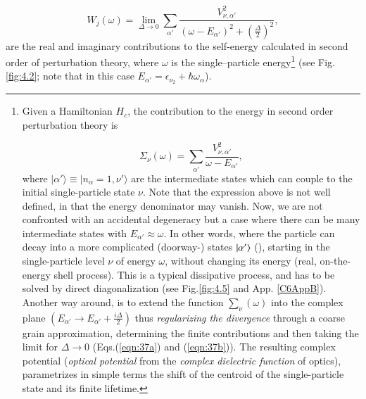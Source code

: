 \begin{equation}
W_j(\omega)  = \lim_{\Delta \rightarrow 0} \sum_{\alpha'} \frac{V_{\nu ,\alpha'}^2}{(\omega -E_{\alpha'})^2 + (\frac{\Delta}{2})^2},
\label{eqn:37b}
\end{equation}
are the real and imaginary contributions to the self-energy calculated in second order of perturbation theory, where $\omega$ is the single--particle energy\footnote{Given a Hamiltonian $H_{c}$, the contribution to the energy in second order perturbation theory is

{\protect
\begin{equation}
\nonumber\Sigma_{\nu}(\omega) = \sum_{\alpha'} \frac{V_{\nu ,\alpha'}^2}{\omega - E_{\alpha'}} ,
\label{eqn:37c}
\end{equation}
}
where $|\alpha' \rangle \equiv |n_{\alpha}=1,\nu' \rangle$ are the intermediate states which can couple to the initial single-particle state $\nu$. Note that the expression above is not well defined, in that the energy denominator may vanish. Now, we are not confronted with an accidental degeneracy but a   case where there can be many intermediate states with $E_{\alpha'} \approx \omega$. In other words, where the particle can decay into a more complicated (doorway-) states $|{\alpha'} \rangle$  (\cite{Feshbach:58}), starting in the single-particle level $\nu$ of energy $\omega$, without changing its energy (real, on-the-energy shell process). This is a typical dissipative  process, and has to be solved by direct diagonalization (see Fig.\ref{fig:4.5} and App. \ref{C6AppB}). Another way around, is to extend the function $\sum_{\nu}(\omega)$ into the complex plane $(E_{\alpha'} \rightarrow E_{\alpha'} + \frac{i\Delta}{2})$ thus {\it regularizing the divergence} through a coarse grain approximation, determining the finite contributions and then taking the limit for $\Delta \rightarrow 0$ (Eqs.(\ref{eqn:37a}) and (\ref{eqn:37b})). The resulting complex potential ({\it optical potential} from the {\it complex dielectric function} of optics), parametrizes in simple terms the shift of the centroid of the single-particle state and its finite lifetime.} (see Fig. \ref{fig:4.2}; note that in this case $E_{\alpha'}=\epsilon_{\nu_2}+\hbar\omega_\alpha$).


